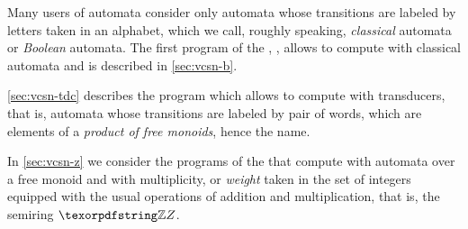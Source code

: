 Many users of automata consider only automata whose transitions are
labeled by letters taken in an alphabet, which we call, roughly
speaking, \emph{classical} automata or \emph{Boolean} automata.  The
first program of the \tafkit, , allows to compute with
classical automata and is described in \autoref{sec:vcsn-b}.

\autoref{sec:vcsn-tdc} describes the program  which
allows to compute with transducers, that is, automata whose
transitions are labeled by pair of words, which are elements of a
\emph{product of free monoids}, hence the name.

In \autoref{sec:vcsn-z} we consider the programs of the \tafkit that
compute with automata over a free monoid and with multiplicity, or
\emph{weight} taken in the set of integers equipped with the usual
operations of addition and multiplication, that is, the semiring $\Z$.



